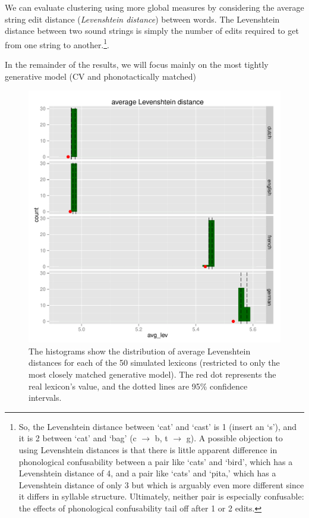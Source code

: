 \documentclass{article}
\begin{document}
We can evaluate clustering using more global measures by considering the average string edit distance
(\textit{Levenshtein distance}) between words. The Levenshtein distance between two sound strings is simply
the number of edits required to get from one string to another.\footnote{So, the Levenshtein distance between
`cat' and `cast' is 1 (insert an `s'), and it is 2 between `cat' and `bag' (c $\rightarrow$ b, t $\rightarrow$
g). A possible objection to using Levenshtein distances is that there is little apparent difference in
phonological confusability between a pair like `cats' and `bird', which has a Levenshtein distance of 4, and a
pair like `cats' and `pita,' which has a Levenshtein distance of only 3 but which is arguably even more
different since it differs in syllable structure. Ultimately, neither pair is especially confusable: the
effects of phonological confusability tail off after 1 or 2 edits. }.

In the remainder of the results, we will focus mainly on the most tightly generative model (CV and
phonotactically matched)


\begin{figure} \centering
  \includegraphics[width=.8\textwidth]{PDFs/avg_lev_n5.pdf}
  \caption{The histograms show the distribution of average Levenshtein distances for each of the 50 simulated
lexicons (restricted to only the most closely matched generative model). The red dot represents the real
lexicon's value, and the dotted lines are 95\% confidence intervals.}
  \label{levs}
\end{figure}
\end{document}
